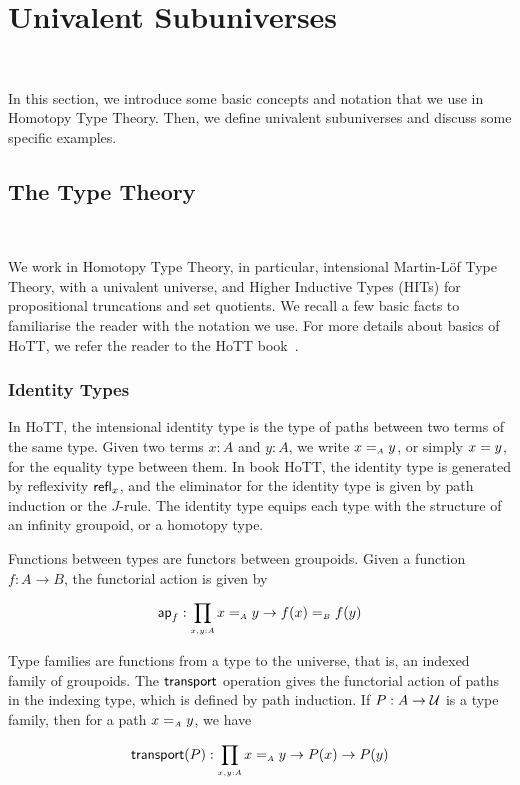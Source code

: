 \section{Univalent Subuniverses}~\label{sec:univalent}

In this section, we introduce some basic concepts and notation that we use in Homotopy Type Theory. Then, we define
univalent subuniverses and discuss some specific examples.

\subsection{The Type Theory}~\label{subsec:type-theory}

We work in Homotopy Type Theory, in particular, intensional Martin-L\"{o}f Type Theory, with a univalent universe, and
Higher Inductive Types (HITs) for propositional truncations and set quotients. We recall a few basic facts to
familiarise the reader with the notation we use. For more details about basics of HoTT, we refer the reader to the HoTT
book~\cite{univalentfoundationsprogramHomotopyTypeTheory2013}.

\subsubsection{Identity Types}

In HoTT, the intensional identity type is the type of paths between two terms of the same type. Given two terms $x:A$
and $y:A$, we write $x \id_{A} y$, or simply $x \id y$, for the equality type between them. In book HoTT, the identity
type is generated by reflexivity $\refl_{x}$, and the eliminator for the identity type is given by path induction or the
$J$-rule. The identity type equips each type with the structure of an infinity groupoid, or a homotopy type.

Functions between types are functors between groupoids. Given a function $f : A \to B$, the functorial action is given
by

\[
  \term{ap}_{f} : \dfun{x,y:A}{x \id_{A} y \to f(x) \id_{B} f(y)}
\]

Type families are functions from a type to the universe, that is, an indexed family of groupoids. The $\operatorname{\mathsf{transport}}$
operation gives the functorial action of paths in the indexing type, which is defined by path induction. If
$P : A \to \mathcal{U}$ is a type family, then for a path $x \id_{A} y$, we have

\[
  \transport{P} : \dfun{x,y:A}{x \id_{A} y \to P(x) \to P(y)}
\]

